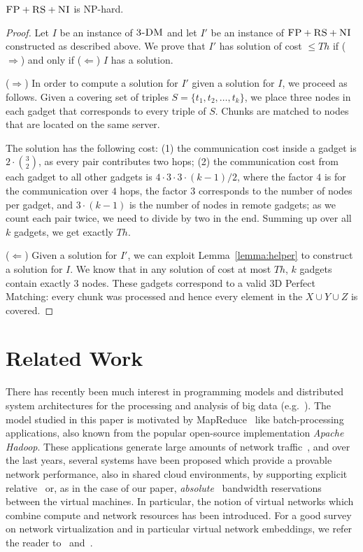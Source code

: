 \documentclass[9pt,twocolumn]{scrartcl}
\newcommand{\CC}{\textsc{NI}}
\newcommand{\FP}{\textsc{FP}}
\newcommand{\RS}{\textsc{RS}}
\newcommand{\TDM}{\textsc{3-DM}}
\newcommand{\Thr}{\ensuremath{Th}}
\begin{document}
\begin{theorem}
$\FP+\RS+\CC$ is NP-hard.
\end{theorem}
\begin{proof}
Let $I$ be an instance of $\TDM$ and let $I'$ be an instance of
$\FP+\RS+\CC$ constructed as described above.
We prove that $I'$ has solution of cost $\leq \Thr$ if ($\Rightarrow$) and only if
($\Leftarrow$)
$I$ has a solution.

($\Rightarrow$) In order to compute a solution
for $I'$ given a solution for $I$, we proceed as follows.
Given a covering set of triples $S = \{t_1, t_2, \ldots, t_k\}$, we place three nodes in each gadget that
corresponds to every triple of $S$. Chunks are matched to nodes that are located
on the same server.

The solution has the following cost:
(1) the communication cost inside a gadget is $2 \cdot {3 \choose 2}$,
  as every pair contributes two hops;
  (2) the communication cost from each gadget to all other gadgets is $4
  \cdot 3 \cdot 3 \cdot (k - 1) / 2$, where the factor $4$ is
  for the
  communication over $4$ hops, the factor $3$
  corresponds to the number of nodes per gadget, and
  $3 \cdot (k-1)$ is the number of nodes in remote gadgets;
  as we count each pair twice, we need to divide by two in the end.
Summing up over all $k$ gadgets, we get exactly $\Thr$.

($\Leftarrow$) Given a solution for $I'$,
we can exploit Lemma~\ref{lemma:helper} to construct a solution for $I$.
We know that in any solution of cost at most $\Thr$,
$k$ gadgets contain exactly 3 nodes. These gadgets correspond to a valid
3D Perfect Matching: every
chunk was processed and hence every element in the $X \cup Y \cup Z$ is covered.
\end{proof}


\section{Related Work}\label{sec:relwork}

There has recently been much interest in programming models and distributed
system architectures for the processing and analysis of big data (e.g.~\cite{nodb,mapreduce,shark}). The model studied in
this paper is motivated by MapReduce~\cite{mapreduce} like batch-processing applications, also known
from the popular open-source implementation \emph{Apache Hadoop}.
These applications
generate large amounts of network traffic~\cite{orchestra,talk-about,amazonbw},
and over the last years, several systems have been proposed which provide
a provable network performance, also in shared cloud environments, by supporting explicit
relative~\cite{faircloud,elasticswitch,seawall}
or, as in the case of our paper, \emph{absolute}~\cite{oktopus,secondnet,drl,gatekeeper,proteus} bandwidth reservations
between the virtual machines.
In particular, the notion of virtual networks which combine compute and network resources has been introduced.
For a good survey on network virtualization and in particular virtual network embeddings,
we refer the reader to~\cite{boutaba-survey} and~\cite{fischer-survey}.
\end{document}
